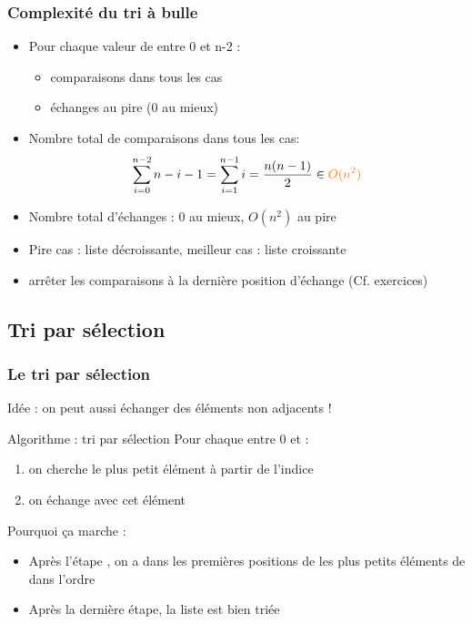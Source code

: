 \documentclass[12pt]{linfo-beamer}
\begin{document}
\begin{frame}
  \frametitle{Complexité du tri à bulle}

  \begin{itemize}
  \item Pour chaque valeur de  entre 0 et n-2 :
    \begin{itemize}
    \item {} comparaisons dans tous les cas
    \item  {} échanges au pire (0 au mieux)
    \end{itemize}
  \item Nombre total de comparaisons dans tous les cas:
    \[
    \sum_{i=0}^{n-2} n-i-1 = \sum_{i=1}^{n-1} i = \frac{n(n-1)}{2} \in {\color{orange} O(n^2)}
    \]
  \item Nombre total d'échanges : 0 au mieux, $O(n^2)$ au pire

  \item Pire cas : liste décroissante, meilleur cas : liste croissante

  \item {} arrêter les comparaisons à
    la dernière position d'échange (Cf. exercices)
  \end{itemize}
\end{frame}


\subsection{Tri par sélection}
\label{sub:tri_par_sélection}

\begin{frame}
  \frametitle{Le tri par sélection}

Idée : on peut aussi échanger des éléments non adjacents !

\vfill

\begin{beamerboxesrounded}{Algorithme : tri par sélection}
Pour chaque  entre 0 et  :
\begin{enumerate}
\item on cherche le plus petit élément à partir de l'indice 
\item on échange  avec cet élément
\end{enumerate}
\end{beamerboxesrounded}

\vfill

Pourquoi ça marche :
\begin{itemize}
\item Après l'étape , on a dans les 
  premières positions de  les  plus petits
  éléments de  dans l'ordre
\item Après la dernière étape, la liste est bien triée
\end{itemize}
\end{frame}
\end{document}
